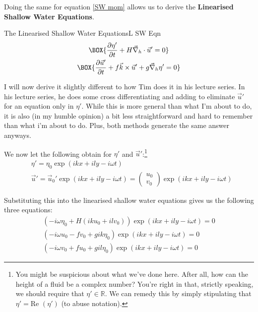 Doing the same for equation \ref{SW mom} allows us to derive the \textbf{Linearised Shallow Water Equations}.

\begin{fact}{The Linearised Shallow Water Equations}{L SW Eqn}\label{L SW Eqn}
    \begin{gather}
        \label{SW Lin mass}
        \BOX{\frac{\partial \eta'}{\partial t}+H\vec{\nabla}_h\cdot \vec{u}'=0}\\
        \label{SW Lin mom}
        \BOX{
            \frac{\partial \vec{u}'}{\partial t}+f\vec{k}\times\vec{u}'
            +
            g\vec{\nabla}_h \eta'=0
        }
    \end{gather}
\end{fact}

I will now derive it slightly different to how Tim does it in his lecture series. In his lecture series, he does some cross differentiating and adding to eliminate $\vec{u}'$ for an equation only in $\eta'$. While this is more general than what I'm about to do, it is also (in my humble opinion) a bit less straightforward and hard to remember than what i'm about to do. Plus, both methods generate the same answer anyways.

We now let the following obtain for $\eta'$ and $\vec{u}'$:\footnote{
    You might be suspicious about what we've done here. After all, how can the height of a fluid be a complex number? You're right in that, strictly speaking, we should require that $\eta'\in\mathbb{R}$. We can remedy this by simply stipulating that $\eta'=\text{Re }\left( \eta' \right)$ (to abuse notation).
}
\begin{align*}
    &\eta' = \eta_0 \exp\left( ikx+ily-i\omega t \right)\\
    &\vec{u}' = \vec{u}_0' \exp\left( ikx+ily-i\omega t \right)=\left( \begin{array}{c}
        u_0\\v_0
    \end{array} \right)\exp\left( ikx+ily-i\omega t \right)
\end{align*}

Substituting this into the linearised shallow water equations gives us the following three equations:
\begin{align*}
    \left( -i\omega\eta_0 + H (iku_0+ilv_0) \right)\exp\left( ikx+ily-i\omega t \right)=0\\
    \left( -i\omega u_0-fv_0+gik\eta_0 \right)\exp\left( ikx+ily-i\omega t \right)=0\\
    \left( -i\omega v_0+fu_0+gil\eta_0 \right)\exp\left( ikx+ily-i\omega t \right)=0
\end{align*}

